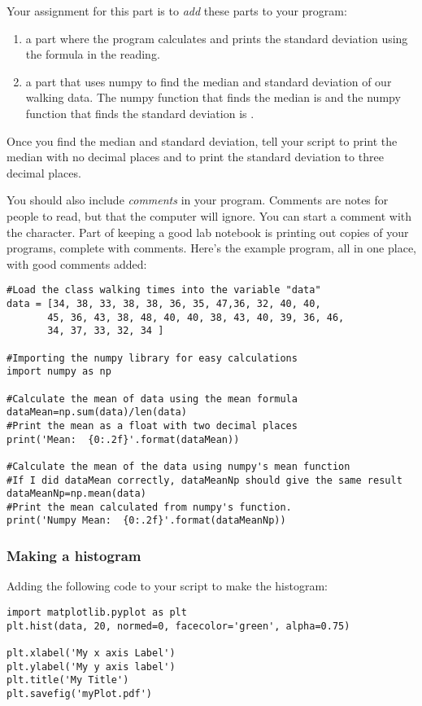 \documentclass[twoside,11pt,ShortChapTitles]{BYUTextbook}
\begin{document}
Your assignment for this part is to {\em add} these parts to your program:
\begin{enumerate}
\item a part where the program calculates and prints the standard deviation using the formula in the reading.
\item a part that uses numpy to find the median and standard deviation of our walking data.  The numpy function that finds the median is  and the numpy function that finds the standard deviation is .
\end{enumerate}
Once you find the median and standard deviation, tell your script to print the median with no decimal places and to print the standard deviation to three decimal places.

You should also include {\em comments} in your program.  Comments are notes for people to read, but that the computer will ignore.  You can start a comment with the \code{#} character.  Part of keeping a good lab notebook is printing out copies of your programs, complete with comments. Here's the example program, all in one place, with good comments added:
\begin{Verbatim}
#Load the class walking times into the variable "data"
data = [34, 38, 33, 38, 38, 36, 35, 47,36, 32, 40, 40,
       45, 36, 43, 38, 48, 40, 40, 38, 43, 40, 39, 36, 46,
       34, 37, 33, 32, 34 ]

#Importing the numpy library for easy calculations
import numpy as np

#Calculate the mean of data using the mean formula
dataMean=np.sum(data)/len(data)
#Print the mean as a float with two decimal places
print('Mean:  {0:.2f}'.format(dataMean))

#Calculate the mean of the data using numpy's mean function
#If I did dataMean correctly, dataMeanNp should give the same result
dataMeanNp=np.mean(data)
#Print the mean calculated from numpy's function.
print('Numpy Mean:  {0:.2f}'.format(dataMeanNp))
\end{Verbatim}

\subsubsection{Making a histogram}

Adding the following code to your script to make the histogram:

\begin{Verbatim}
import matplotlib.pyplot as plt
plt.hist(data, 20, normed=0, facecolor='green', alpha=0.75)

plt.xlabel('My x axis Label')
plt.ylabel('My y axis label')
plt.title('My Title')
plt.savefig('myPlot.pdf')
\end{Verbatim}
\end{document}
